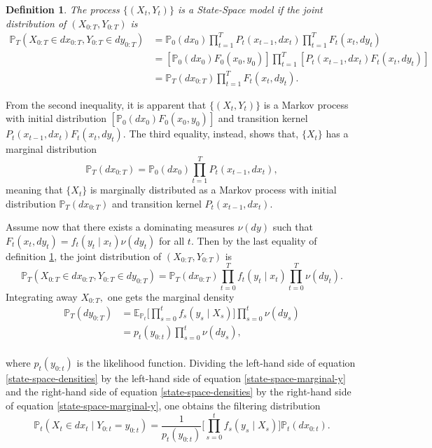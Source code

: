 \documentclass[
]{book}
\theoremstyle{break}
\newtheorem{definition}{Definition}
\theoremstyle{nonumberplain}
\begin{document}
\begin{definition}\label{state-space-def}
The process $\{(X_t,Y_t)\}$ is a State-Space model if the joint distribution of $(X_{0:T},Y_{0:T})$ is 
\begin{align*}
  \mathbb{P}_T(X_{0:T}\in dx_{0:T},Y_{0:T}\in dy_{0:T}) &= \mathbb{P}_0(dx_0)\prod\limits_{t=1}^T P_t(x_{t-1},dx_t)\prod\limits_{t=1}^T F_t(x_t,dy_t)\\
  &= [\mathbb{P}_0(dx_0)F_0(x_0,y_0)]\prod\limits_{t=1}^T[P_t(x_{t-1},dx_t)F_t(x_t,dy_t)] \\
  &= \mathbb{P}_T(dx_{0:T})\prod \limits_{t=1}^T F_t(x_t,dy_t).
\end{align*}
\end{definition}

From the second inequality, it is apparent that \(\{(X_t,Y_t)\}\) is a
Markov process with initial distribution
\([\mathbb{P}_0(dx_0)F_0(x_0,y_0)]\) and transition kernel
\(P_t(x_{t-1},dx_t)F_t(x_t,dy_t).\) The third equality, instead, shows
that, \(\{X_t\}\) has a marginal distribution
\[\mathbb{P}_T(dx_{0:T})=\mathbb{P}_0(dx_0)\prod_{t=1}^T P_t(x_{t-1},dx_t),\]
meaning that \(\{X_t\}\) is marginally distributed as a Markov process
with initial distribution \(\mathbb{P}_T(dx_{0:T})\) and transition
kernel \(P_t(x_{t-1},dx_t).\)

Assume now that there exists a dominating measures \(\nu(dy)\) such that
\(F_t(x_t,dy_t)=f_t(y_t\mid x_t)\nu(dy_t)\) for all \(t.\) Then by the
last equality of definition \ref{state-space-def}, the joint
distribution of \((X_{0:T},Y_{0:T})\) is
\begin{equation}\label{state-space-densities}
   \mathbb{P}_T(X_{0:T}\in dx_{0:T},Y_{0:T}\in dy_{0:T})=\mathbb{P}_T(dx_{0:T})\prod\limits_{t=0}^T f_t(y_t\mid x_t)\prod\limits_{t=0}^T\nu(dy_t).
\end{equation} Integrating away \(X_{0:T},\) one gets the marginal
density \begin{align*}\label{state-space-marginal-y}
  \mathbb{P}_T(dy_{0:T}) &= \mathbb E_{\mathbb{P}_{t}}\big[\prod\limits_{s=0}^t f_s(y_s\mid X_s) \big] \prod\limits_{s=0}^t\nu(dy_s) \\
                &= p_t(y_{0:t})\prod\limits_{s=0}^t\nu(dy_s),
\end{align*}\\
where \(p_t(y_{0:t})\) is the likelihood function. Dividing the
left-hand side of equation \ref{state-space-densities} by the left-hand
side of equation \ref{state-space-marginal-y} and the right-hand side of
equation \ref{state-space-densities} by the right-hand side of equation
\ref{state-space-marginal-y}, one obtains the filtering distribution
\begin{equation}
\mathbb{P}_t(X_{t}\in dx_{t}\mid Y_{0:t}=y_{0:t})=\frac{1}{p_t(y_{0:t})}\big[\prod\limits_{s=0}^t f_s(y_s\mid X_s) \big]\mathbb{P}_t(dx_{0:t}).
\end{equation}
\end{document}
